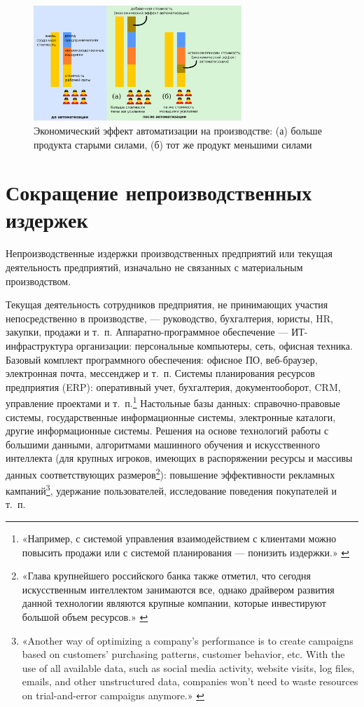 \documentclass{article}
\begin{document}
\begin{figure}[h]
    \centering
    \includegraphics[width=0.70\textwidth]{effect-manufacturing}
    \caption{Экономический эффект автоматизации на производстве: (а) больше продукта старыми силами, (б) тот же продукт меньшими силами}
    \label{fig:effect_manufacturing}
\end{figure}

\section*{Сокращение непроизводственных издержек}

Непроизводственные издержки производственных предприятий или текущая деятельность предприятий, изначально не связанных с материальным производством.

Текущая деятельность сотрудников предприятия, не принимающих участия непосредственно в производстве, — руководство, бухгалтерия, юристы, HR, закупки, продажи и т.~п. Аппаратно-программное обеспечение — ИТ-инфраструктура организации: персональные компьютеры, сеть, офисная техника. Базовый комплект программного обеспечения: офисное ПО, веб-браузер, электронная почта, мессенджер и т.~п. Системы планирования ресурсов предприятия (ERP): оперативный учет, бухгалтерия, документооборот, CRM, управление проектами и т.~п.\footnote{«Например, с системой управления взаимодействием с клиентами можно повысить продажи или с системой планирования — понизить издержки.» \cite{vedomostiItIsReal}} Настольные базы данных: справочно-правовые системы, государственные информационные системы, электронные каталоги, другие информационные системы. Решения на основе технологий работы с большими данными, алгоритмами машинного обучения и искусственного интеллекта (для крупных игроков, имеющих в распоряжении ресурсы и массивы данных соответствующих размеров\footnote{«Глава крупнейшего российского банка также отметил, что сегодня искусственным интеллектом занимаются все, однако драйвером развития данной технологии являются крупные компании, которые инвестируют большой объем ресурсов.» \cite{sberAiLoss2019}}): повышение эффективности рекламных кампаний\footnote{«Another way of optimizing a company’s performance is to create campaigns based on customers’ purchasing patterns, customer behavior, etc. With the use of all available data, such as social media activity, website visits, log files, emails, and other unstructured data, companies won’t need to waste resources on trial-and-error campaigns anymore.» \cite{marketingBigData2022}}, удержание пользователей, исследование поведения покупателей и т.~п.
\end{document}
